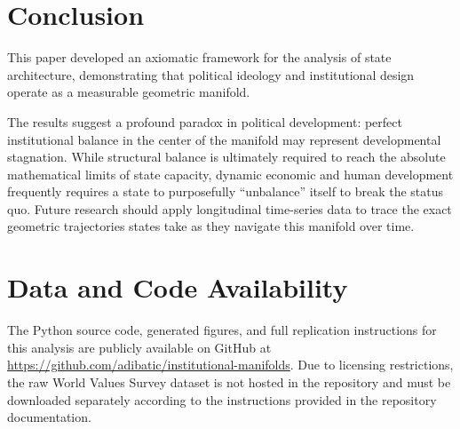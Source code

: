 \documentclass[12pt]{article}
\begin{document}
\section{Conclusion}

This paper developed an axiomatic framework for the analysis of state architecture, demonstrating that political ideology and institutional design operate as a measurable geometric manifold.

The results suggest a profound paradox in political development: perfect institutional balance in the center of the manifold may represent developmental stagnation. While structural balance is ultimately required to reach the absolute mathematical limits of state capacity, dynamic economic and human development frequently requires a state to purposefully ``unbalance'' itself to break the status quo. Future research should apply longitudinal time-series data to trace the exact geometric trajectories states take as they navigate this manifold over time.

\section*{Data and Code Availability}
The Python source code, generated figures, and full replication instructions for this analysis are publicly available on GitHub at \url{https://github.com/adibatic/institutional-manifolds}. Due to licensing restrictions, the raw World Values Survey dataset is not hosted in the repository and must be downloaded separately according to the instructions provided in the repository documentation.
\end{document}
